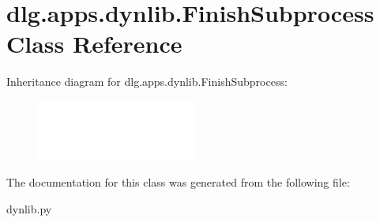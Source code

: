 \hypertarget{classdlg_1_1apps_1_1dynlib_1_1_finish_subprocess}{}\section{dlg.\+apps.\+dynlib.\+Finish\+Subprocess Class Reference}
\label{classdlg_1_1apps_1_1dynlib_1_1_finish_subprocess}
Inheritance diagram for dlg.\+apps.\+dynlib.\+Finish\+Subprocess\+:\begin{figure}[H]
\begin{center}
\leavevmode
\includegraphics[height=2.000000cm]{classdlg_1_1apps_1_1dynlib_1_1_finish_subprocess}
\end{center}
\end{figure}


The documentation for this class was generated from the following file\+:\begin{DoxyCompactItemize}
\item 
dynlib.\+py\end{DoxyCompactItemize}

